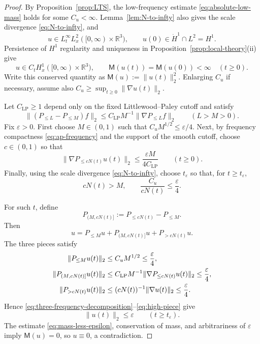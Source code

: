 \documentclass{interact}
\numberwithin{equation}{section}
\theoremstyle{plain}
\theoremstyle{definition}
\theoremstyle{remark}
\newcommand{\R}{\mathbb R}
\newcommand{\M}{\mathsf M}
\begin{document}
\begin{proof}
By Proposition~\ref{prop:LTS}, the low-frequency estimate \eqref{eq:absolute-low-mass} holds for some $C_u<\infty$. Lemma~\ref{lem:N-to-infty} also gives the scale divergence \eqref{eq:N-to-infty}, and
\[
 u\in L_t^\infty L_x^2([0,\infty)\times\R^3),
 \qquad
 u(0)\in\dot H^1\cap L^2=H^1.
\]
Persistence of $H^1$ regularity and uniqueness in Proposition~\ref{prop:local-theory}(ii) give
\[
 u\in C_tH_x^1([0,\infty)\times\R^3),
 \qquad
 \M(u(t))=\M(u(0))<\infty
 \quad(t\ge0).
\]
Write this conserved quantity as $\M(u):=\|u(t)\|_2^2$. Enlarging $C_u$ if necessary, assume also $C_u\ge\sup_{t\ge0}\|\nabla u(t)\|_2$.

Let $C_{\mathrm{LP}}\ge1$ depend only on the fixed Littlewood--Paley cutoff and satisfy
\[
 \|(P_{\le L}-P_{\le M})f\|_2
 \le C_{\mathrm{LP}}M^{-1}\|\nabla P_{\le L}f\|_2
 \qquad(L>M>0).
\]
Fix $\varepsilon>0$. First choose $M\in(0,1)$ such that $C_uM^{1/2}\le\varepsilon/4$. Next, by frequency compactness \eqref{eq:ap-frequency} and the support of the smooth cutoff, choose $c\in(0,1)$ so that
\[
 \|\nabla P_{\le cN(t)}u(t)\|_2
 \le \frac{\varepsilon M}{4C_{\mathrm{LP}}}
 \qquad(t\ge0).
\]
Finally, using the scale divergence \eqref{eq:N-to-infty}, choose $t_\varepsilon$ so that, for $t\ge t_\varepsilon$,
\[
 cN(t)>M,
 \qquad
 \frac{C_u}{cN(t)}\le\frac{\varepsilon}{4}.
\]

For such $t$, define
\[
 P_{(M,cN(t)]}:=P_{\le cN(t)}-P_{\le M}.
\]
Then
\begin{equation}\label{eq:three-frequency-decomposition}
 u=P_{\le M}u+P_{(M,cN(t)]}u+P_{>cN(t)}u.
\end{equation}
The three pieces satisfy
\begin{align}
 \|P_{\le M}u(t)\|_2
 &\le C_uM^{1/2}\le\frac{\varepsilon}{4},\notag\\
 \|P_{(M,cN(t)]}u(t)\|_2
 &\le C_{\mathrm{LP}}M^{-1}
 \|\nabla P_{\le cN(t)}u(t)\|_2
 \le\frac{\varepsilon}{4},\notag\\
 \|P_{>cN(t)}u(t)\|_2
 &\le(cN(t))^{-1}\|\nabla u(t)\|_2
 \le\frac{\varepsilon}{4}.
 \label{eq:high-piece}
\end{align}
Hence \eqref{eq:three-frequency-decomposition}--\eqref{eq:high-piece} give
\begin{equation}\label{eq:mass-less-epsilon}
 \|u(t)\|_2\le\varepsilon
 \qquad(t\ge t_\varepsilon).
\end{equation}
The estimate \eqref{eq:mass-less-epsilon}, conservation of mass, and arbitrariness of $\varepsilon$ imply $\M(u)=0$, so $u\equiv0$, a contradiction.
\end{proof}
\end{document}
